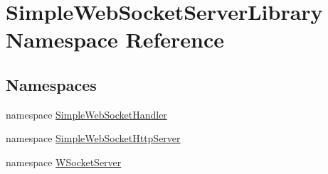\hypertarget{namespace_simple_web_socket_server_library}{}\section{Simple\+Web\+Socket\+Server\+Library Namespace Reference}
\label{namespace_simple_web_socket_server_library}
\subsection*{Namespaces}
\begin{DoxyCompactItemize}
\item 
namespace \mbox{\hyperlink{namespace_simple_web_socket_server_library_1_1_simple_web_socket_handler}{Simple\+Web\+Socket\+Handler}}
\item 
namespace \mbox{\hyperlink{namespace_simple_web_socket_server_library_1_1_simple_web_socket_http_server}{Simple\+Web\+Socket\+Http\+Server}}
\item 
namespace \mbox{\hyperlink{namespace_simple_web_socket_server_library_1_1_w_socket_server}{W\+Socket\+Server}}
\end{DoxyCompactItemize}
